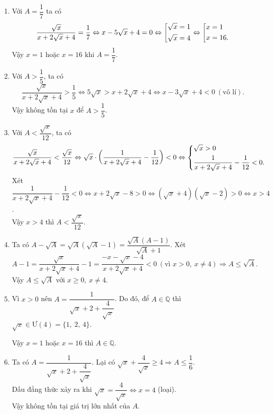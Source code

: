 \begin{bt}
{\begin{enumerate}
\[			\]
			Với $ x=\dfrac{9}{4} $ ta có $ A=\dfrac{\dfrac{3}{2}}{\dfrac{9}{4}+2\cdot \dfrac{3}{2}+4}=\dfrac{6}{37}$.
			\item Với $ A=\dfrac{1}{7} $ ta có
			\[ 
			\dfrac{\sqrt{x}}{x+2\sqrt{x}+4}=\dfrac{1}{7}\Leftrightarrow x-5\sqrt{x}+4=0\Leftrightarrow \left[\begin{aligned}&\sqrt{x}=1\\ &\sqrt{x}=4\end{aligned}\right.\Leftrightarrow \left[\begin{aligned}&x=1\\ &x=16.\end{aligned}\right.
			\]
			Vậy $ x=1 $ hoặc $ x=16 $ khi $ A=\dfrac{1}{7} $.
			\item Với $ A>\dfrac{1}{5} $, ta có 
			\[
			\dfrac{\sqrt{x}}{x+2\sqrt{x}+4}>\dfrac{1}{5}\Leftrightarrow 5\sqrt{x}>x+2\sqrt{x}+4\Leftrightarrow x-3\sqrt{x}+4<0\ (\text{vô lí}).
			\]
			Vậy không tồn tại $ x $ để $ A>\dfrac{1}{5} $.
			\item Với $ A<\dfrac{\sqrt{x}}{12} $, ta có 
			\[
			\dfrac{\sqrt{x}}{x+2\sqrt{x}+4}<\dfrac{\sqrt{x}}{12}\Leftrightarrow \sqrt{x}\cdot \left( \dfrac{1}{x+2\sqrt{x}+4}-\dfrac{1}{12}\right)<0\Leftrightarrow\left\{\begin{aligned}&\sqrt{x}>0\\ &\dfrac{1}{x+2\sqrt{x}+4}-\dfrac{1}{12}<0.\end{aligned}\right.
			\]
			Xét $\dfrac{1}{x+2\sqrt{x}+4}-\dfrac{1}{12}<0\Leftrightarrow x+2\sqrt{x}-8>0\Leftrightarrow (\sqrt{x}+4)(\sqrt{x}-2)>0\Leftrightarrow x>4 $.\\
			Vậy $ x>4 $ thì $ A<\dfrac{\sqrt{x}}{12} $.
			\item Ta có $ A-\sqrt{A}=\sqrt{A}(\sqrt{A}-1)=\dfrac{\sqrt{A}(A-1)}{\sqrt{A}+1} $. Xét 
			\[ 
			A-1=\dfrac{\sqrt{x}}{x+2\sqrt{x}+4}-1=\dfrac{-x-\sqrt{x}-4}{x+2\sqrt{x}+4}<0\ (\text{vì }x>0,\ x\neq 4)\Rightarrow A\leq \sqrt{A}.
			\]
			Vậy $ A\leq \sqrt{A} $ với $ x\geq 0,\ x\neq 4 $.
			\item Vì $ x>0 $ nên $ A=\dfrac{1}{\sqrt{x}+2+\dfrac{4}{\sqrt{x}}}$. Do đó, để $ A\in \mathbb{Q} $ thì $ \sqrt{x}\in\text{Ư}(4)=\{1,\ 2,\ 4\} $.
			\begin{center}
			\end{center}
			Vậy $ x=1$ hoặc $x= 16 $ thì $ A\in\mathbb{Q} $.
			\item Ta có $ A=\dfrac{1}{\sqrt{x}+2+\dfrac{4}{\sqrt{x}}} $. Lại có $ \sqrt{x}+\dfrac{4}{\sqrt{x}}\geq 4\Rightarrow A\leq \dfrac{1}{6} $.\\
			Dấu đẳng thức xảy ra khi $ \sqrt{x}=\dfrac{4}{\sqrt{x}}\Leftrightarrow x=4 $ (loại).\\
			Vậy không tồn tại giá trị lớn nhất của $ A $.
		\end{enumerate}
	}
\end{bt}

